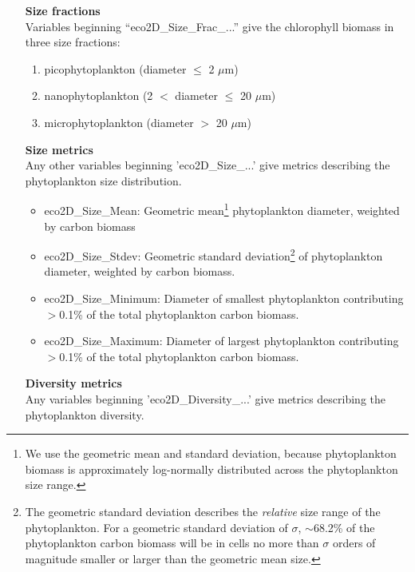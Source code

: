 \documentclass[11pt,fleqn]{book} %
\begin{document}
\vspace{2mm} 
\begin{itemize}[noitemsep]

\item[\textbf{Size fractions}] \
\\Variables beginning ``\textsf{\small eco2D\_Size\_Frac\_...}'' give the chlorophyll biomass in three size fractions:
\begin{enumerate}[noitemsep]
\item picophytoplankton (diameter $\le$ 2 $\mu$m)
\item nanophytoplankton (2 $<$ diameter $\le$ 20 $\mu$m)
\item microphytoplankton (diameter $>$ 20 $\mu$m)
\end{enumerate}

\item[\textbf{Size metrics}] \
\\Any other variables beginning '\textsf{\small eco2D\_Size\_...}' give metrics describing the {phytoplankton} size distribution.

\begin{itemize}[noitemsep]
\item \textsf{\small eco2D\_Size\_Mean}: Geometric mean\footnote{ We use the geometric mean and standard deviation, because phytoplankton biomass is approximately log-normally distributed across the phytoplankton size range.} phytoplankton diameter, weighted by carbon biomass
\item \textsf{\small eco2D\_Size\_Stdev}: Geometric standard deviation\footnote{ The geometric standard deviation describes the \textit{relative} size range of the phytoplankton. For a geometric standard deviation of $\sigma$, $\sim$68.2\% of the phytoplankton carbon biomass will be in cells no more than $\sigma$ orders of magnitude smaller or larger than the geometric mean size.} of phytoplankton diameter, weighted by carbon biomass. 
\item \textsf{\small eco2D\_Size\_Minimum}: Diameter of smallest phytoplankton contributing $>$0.1\% of the total phytoplankton carbon biomass.
\item \textsf{\small eco2D\_Size\_Maximum}: Diameter of largest phytoplankton contributing $>$0.1\% of the total phytoplankton carbon biomass.
\end{itemize}

\item[\textbf{Diversity metrics}] \
\\Any variables beginning '\textsf{\small eco2D\_Diversity\_...}' give metrics describing the {phytoplankton} diversity.


\end{itemize}
\end{document}
